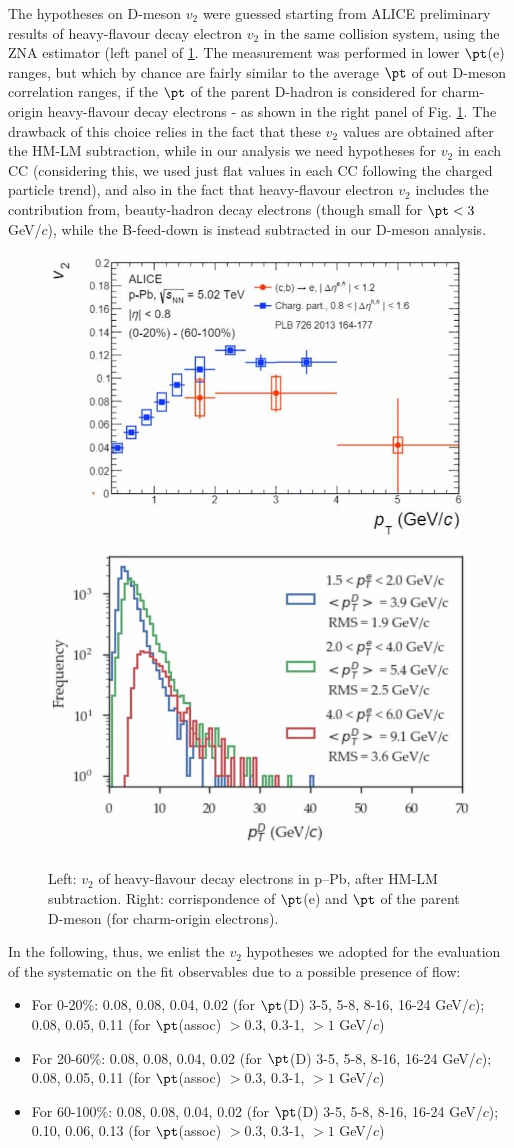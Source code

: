 The hypotheses on D-meson $v_2$ were guessed starting from ALICE preliminary results of heavy-flavour decay electron $v_2$ in the same collision system, using the ZNA estimator (left panel of \ref{fig:v2D}. The measurement was performed in lower $\pt$(e) ranges, but which by chance are fairly similar to the average $\pt$ of out D-meson correlation ranges, if the $\pt$ of the parent D-hadron is considered for charm-origin heavy-flavour decay electrons - as shown in the right panel of Fig. \ref{fig:v2D}. The drawback of this choice relies in the fact that these $v_2$ values are obtained after the HM-LM subtraction, while in our analysis we need hypotheses for $v_2$ in each CC (considering this, we used just flat values in each CC following the charged particle trend), and also in the fact that heavy-flavour electron $v_2$ includes the contribution from, beauty-hadron decay electrons (though small for $\pt < 3$ GeV/$c$), while the B-feed-down is instead subtracted in our D-meson analysis.

\begin{figure}
\centering
{\includegraphics[width=0.4\linewidth]{figuresVsCent/Global/v2/v2D1.jpg}}
{\includegraphics[width=0.4\linewidth]{figuresVsCent/Global/v2/v2D2.jpg}}
 \caption{Left: $v_2$ of heavy-flavour decay electrons in p--Pb, after HM-LM subtraction. Right: corrispondence of $\pt$(e) and $\pt$ of the parent D-meson (for charm-origin electrons).}
\label{fig:v2D}
\end{figure}

In the following, thus, we enlist the $v_2$ hypotheses we adopted for the evaluation of the systematic on the fit observables due to a possible presence of flow:
\begin{itemize}
  \item For 0-20\%: 0.08, 0.08, 0.04, 0.02 (for $\pt$(D) 3-5, 5-8, 8-16, 16-24 GeV/$c$); 0.08, 0.05, 0.11 (for $\pt$(assoc) $>0.3$, 0.3-1, $>1$ GeV/$c$)
  \item For 20-60\%: 0.08, 0.08, 0.04, 0.02 (for $\pt$(D) 3-5, 5-8, 8-16, 16-24 GeV/$c$); 0.08, 0.05, 0.11 (for $\pt$(assoc) $>0.3$, 0.3-1, $>1$ GeV/$c$)
  \item For 60-100\%: 0.08, 0.08, 0.04, 0.02 (for $\pt$(D) 3-5, 5-8, 8-16, 16-24 GeV/$c$); 0.10, 0.06, 0.13 (for $\pt$(assoc) $>0.3$, 0.3-1, $>1$ GeV/$c$)
\end{itemize}
